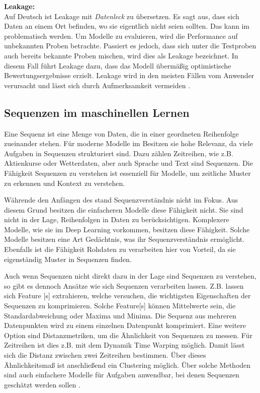 \textbf{\gls{Leakage}:}\\
Auf Deutsch ist \gls{Leakage} mit \textit{Datenleck} zu übersetzen. Es sagt aus, dass sich Daten an einem Ort befinden, wo sie eigentlich nicht seien sollten. Das kann im  problematisch werden. Um Modelle zu evaluieren, wird die Performance auf unbekannten Proben betrachte. Passiert es jedoch, dass sich unter die Testproben auch bereits bekannte Proben mischen, wird dies als \gls{Leakage} bezeichnet. In diesem Fall führt \gls{Leakage} dazu, dass das Modell übermäßig optimistische Bewertungsergebnisse erzielt. \gls{Leakage} wird in den meisten Fällen vom Anwender verursacht und lässt sich durch Aufmerksamkeit vermeiden \cite{Zheng.2015}.


\subsection{Sequenzen im maschinellen Lernen} \label{sec:sequenzen ML}
Eine Sequenz ist eine Menge von Daten, die in einer geordneten Reihenfolge zueinander stehen. Für moderne Modelle im  Besitzen sie hohe Relevanz, da viele Aufgaben in Sequenzen strukturiert sind. Dazu zählen Zeitreihen, wie z.B. Aktienkurse oder Wetterdaten, aber auch Sprache und Text sind Sequenzen. Die Fähigkeit Sequenzen zu verstehen ist essenziell für Modelle, um zeitliche Muster zu erkennen und Kontext zu verstehen. \par

Währende den Anfängen des  stand Sequenzverständnis nicht im Fokus. Aus diesem Grund besitzen die einfacheren Modelle diese Fähigkeit nicht. Sie sind nicht in der Lage, Reihenfolgen in Daten zu berücksichtigen. Komplexere Modelle, wie sie im \gls{Deep Learning} vorkommen, besitzen diese Fähigkeit. Solche Modelle besitzen eine Art Gedächtnis, was ihr Sequenzverständnis ermöglicht. Ebenfalls ist die Fähigkeit Rohdaten zu verarbeiten hier von Vorteil, da sie eigenständig Muster in Sequenzen finden.\par

Auch wenn Sequenzen nicht direkt dazu in der Lage sind Sequenzen zu verstehen, so gibt es dennoch Ansätze wie sich Sequenzen verarbeiten lassen. Z.B. lassen sich \gls{Feature} [s] extrahieren, welche versuchen, die wichtigsten Eigenschaften der Sequenzen zu komprimieren. Solche \gls{Feature}[s] können Mittelwerte sein, die Standardabweichung oder Maxima und Minima. Die Sequenz aus mehreren Datenpunkten wird zu einem einzelnen Datenpunkt komprimiert. Eine weitere Option sind Distanzmetriken, um die Ähnlichkeit von Sequenzen zu messen. Für Zeitreihen ist dies z.B. mit dem Dynamik Time Warping möglich. Damit lässt sich die Distanz zwischen zwei Zeitreihen bestimmen. Über dieses Ähnlichkeitsmaß ist anschließend ein Clustering möglich. Über solche Methoden sind auch einfachere Modelle für Aufgaben anwendbar, bei denen Sequenzen geschätzt werden sollen \cite{Nielsen.2020}.